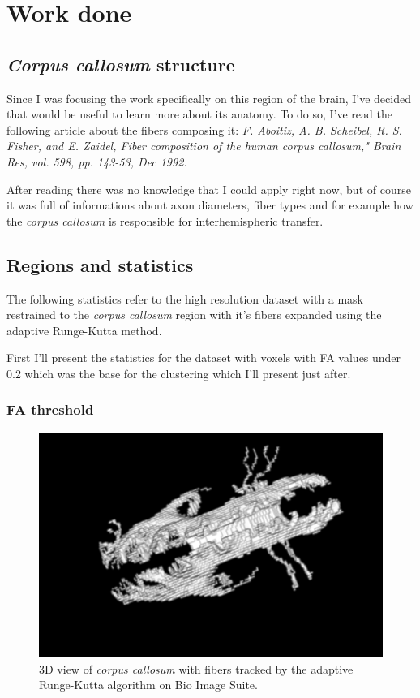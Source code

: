 \documentclass[a4paper,11pt]{report}
\begin{document}
\chapter{Work done}

  \section{\textit{Corpus callosum} structure}
  Since I was focusing the work specifically on this region of the brain, I've decided that would be useful to learn more about its anatomy. To do so, I've read the following article about the fibers composing it: \textit{F. Aboitiz, A. B. Scheibel, R. S. Fisher, and E. Zaidel, Fiber composition of the human corpus callosum," Brain Res, vol. 598, pp. 143-53, Dec 1992.}

  After reading there was no knowledge that I could apply right now, but of course it was full of informations about axon diameters, fiber types and for example how the \textit{corpus callosum} is responsible for interhemispheric transfer.

  \section{Regions and statistics}
  The following statistics refer to the high resolution dataset with a mask restrained to the \textit{corpus callosum} region with it's fibers expanded using the adaptive Runge-Kutta method.

  First I'll present the statistics for the dataset with voxels with FA values under 0.2 which was the base for the clustering which I'll present just after.

    \newpage
    \subsection{FA threshold}\label{subsec:fa-threshold}

    \begin{figure}[!ht]
      \includegraphics[width=1\linewidth]{img/regions/whole.png}
      \caption{3D view of \textit{corpus callosum} with fibers tracked by the adaptive Runge-Kutta algorithm on Bio Image Suite.}
      \label{fig:whole}
    \end{figure}
\end{document}
